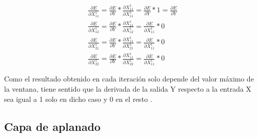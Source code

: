 \begin{gather}
	\frac{\partial E}{\partial X^1_{11}} = \frac{\partial E}{\partial Y} * \frac{\partial X^1_{11}}{\partial X^1_{11}} = \frac{\partial E}{\partial Y} * 1 = \frac{\partial E}{\partial Y} \\
	\frac{\partial E}{\partial X^1_{12}} = \frac{\partial E}{\partial Y} * \frac{\partial X^1_{11}}{\partial X^1_{12}} = \frac{\partial E}{\partial X^1_{11}} * 0 \\
	\frac{\partial E}{\partial X^1_{21}} = \frac{\partial E}{\partial Y} * \frac{\partial X^1_{11}}{\partial X^1_{21}} = \frac{\partial E}{\partial X^1_{11}} * 0 \\
	\frac{\partial E}{\partial X^1_{22}} = \frac{\partial E}{\partial Y} * \frac{\partial X^1_{11}}{\partial X^1_{22}} = \frac{\partial E}{\partial X^1_{11}} * 0
\end{gather}


 
Como el resultado obtenido en cada iteración solo depende del valor máximo de la ventana, tiene sentido que la derivada de la salida Y respecto a la entrada X sea igual a 1 solo en dicho caso y 0 en el resto \cite{max_pool_backprop} \cite{max_pool_backprop_2}.
\subsection{Capa de aplanado}

